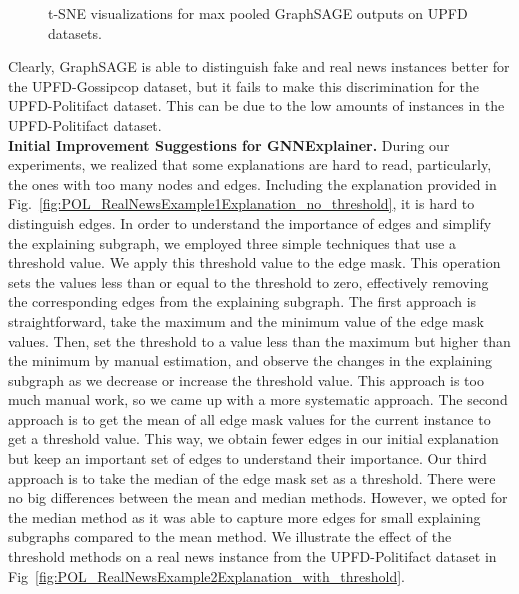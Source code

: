 \begin{figure}
    \centering
    \hfill
    \caption[t-SNE visualizations for GraphSAGE.]{t-SNE visualizations for max pooled GraphSAGE outputs on UPFD datasets.}
    \label{fig:TSNE_GraphSAGE}
\end{figure}
Clearly, GraphSAGE is able to distinguish fake and real news instances better for the UPFD-Gossipcop dataset, but it fails to make this discrimination for the UPFD-Politifact dataset. This can be due to the low amounts of instances in the UPFD-Politifact dataset.\\
\textbf{Initial Improvement Suggestions for GNNExplainer.} During our experiments, we realized that some explanations are hard to read, particularly, the ones with too many nodes and edges. Including the explanation provided in Fig.~\ref{fig:POL_RealNewsExample1Explanation_no_threshold}, it is hard to distinguish edges. In order to understand the importance of edges and simplify the explaining subgraph, we employed three simple techniques that use a threshold value. We apply this threshold value to the edge mask. This operation  sets the values less than or equal to the threshold to zero, effectively removing the corresponding edges from the explaining subgraph. The first approach is straightforward, take the maximum and the minimum value of the edge mask values. Then, set the threshold to a value less than the maximum but higher than the minimum by manual estimation, and observe the changes in the explaining subgraph as we decrease or increase the threshold value. This approach is too much manual work, so we came up with a more systematic approach. The second approach is to get the mean of all edge mask values for the current instance to get a threshold value. This way, we obtain fewer edges in our initial explanation but keep an important set of edges to understand their importance. Our third approach is to take the median of the edge mask set as a threshold. There were no big differences between the mean and median methods. However, we opted for the median method as it was able to capture more edges for small explaining subgraphs compared to the mean method. We illustrate the effect of the threshold methods on a real news instance from the UPFD-Politifact dataset in Fig~\ref{fig:POL_RealNewsExample2Explanation_with_threshold}.\\

